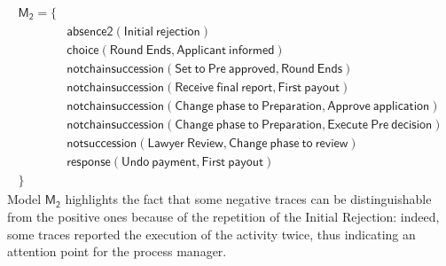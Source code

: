 \begin{align*}
\mathsf{M_2} = \{ & \\
& \mathsf{ absence2(Initial\ rejection)} \\
& \mathsf{ choice(Round\ Ends, Applicant\ informed)} \\
& \mathsf{ notchainsuccession(Set\ to\ Pre\ approved, Round\ Ends)} \\
& \mathsf{ notchainsuccession(Receive\ final\ report, First\ payout)} \\
& \mathsf{ notchainsuccession(Change\ phase\ to\ Preparation, Approve\ application)} \\
& \mathsf{ notchainsuccession(Change\ phase\ to\ Preparation, Execute\ Pre\ decision)} \\
& \mathsf{ notsuccession(Lawyer\ Review, Change\ phase\ to\ review)} \\
& \mathsf{ response(Undo\ payment, First\ payout) } \\
\} & 
\end{align*}
%
Model $\mathsf{M_2}$ highlights the fact that some negative traces can be distinguishable from the positive ones because of the repetition of the \textsf{Initial Rejection}: indeed, some traces reported the execution of the activity twice, thus indicating an attention point for the process manager.



